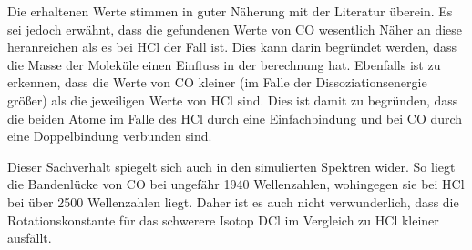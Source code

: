 Die erhaltenen Werte stimmen in guter Näherung mit der Literatur überein. Es sei jedoch erwähnt, dass die gefundenen Werte von CO wesentlich Näher an diese heranreichen als es bei HCl der Fall ist. Dies kann darin begründet werden, dass die Masse der Moleküle einen Einfluss in der berechnung hat. Ebenfalls ist zu erkennen, dass  die Werte von CO kleiner (im Falle der Dissoziationsenergie größer) als die jeweiligen Werte von HCl sind. Dies ist damit zu begründen, dass die beiden Atome im Falle des HCl durch eine Einfachbindung und bei CO durch eine Doppelbindung verbunden sind. 
 
Dieser Sachverhalt spiegelt sich auch in den simulierten Spektren wider. So liegt die Bandenlücke von CO bei ungefähr 1940 Wellenzahlen, wohingegen sie bei HCl bei über 2500 Wellenzahlen liegt. Daher ist es auch nicht verwunderlich, dass die Rotationskonstante für das schwerere Isotop DCl im Vergleich zu HCl kleiner ausfällt.

%